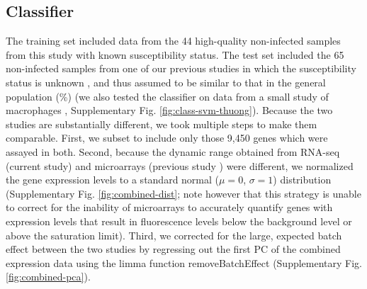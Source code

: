 \documentclass[fleqn,10pt]{wlscirep}
\begin{document}
\subsection*{Classifier}

The training set included data from the 44 high-quality non-infected
samples from this study with known susceptibility status. The test set
included the 65 non-infected samples from one of our previous studies
in which the susceptibility status is unknown \cite{Barreiro2012}, and
thus assumed to be similar to that in the general population
(\%) (we also tested the classifier on data from a
small study of macrophages \cite{Thuong2008}, Supplementary Fig.
\ref{fig:class-svm-thuong}). Because the two studies are substantially
different, we took multiple steps to make them comparable. First, we
subset to include only those 9,450 genes which were assayed in both.
Second, because the dynamic range obtained from RNA-seq (current
study) and microarrays (previous study \cite{Barreiro2012}) were
different, we normalized the gene expression levels to a standard
normal ($\mu = 0$, $\sigma = 1$) distribution (Supplementary Fig.
\ref{fig:combined-dist}; note however that this strategy is unable to
correct for the inability of microarrays to accurately quantify genes
with expression levels that result in fluorescence levels below the
background level or above the saturation limit). Third, we corrected
for the large, expected batch effect between the two studies by
regressing out the first PC of the combined expression data using the
limma function removeBatchEffect \cite{Ritchie2015} (Supplementary
Fig. \ref{fig:combined-pca}).
\end{document}
